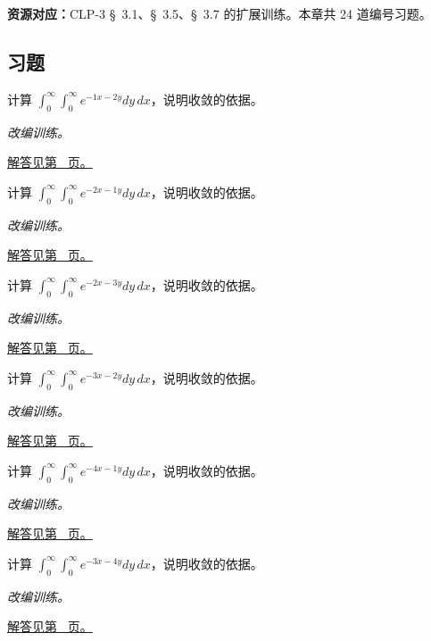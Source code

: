 \documentclass[UTF8,12pt,a4paper,fontset=fandol]{ctexart}
\begin{document}
\textbf{资源对应：}CLP-3 \S~3.1、\S~3.5、\S~3.7 的扩展训练。本章共 24 道编号习题。
\subsection{习题}
\begin{example}[第一象限的指数积分]\label{ex:c40q1}
计算 $\displaystyle\int_0^\infty\int_0^\infty e^{-1x-2y}dy\,dx$，说明收敛的依据。
\par\textit{改编训练。}\par\hyperref[ans:c40q1]{解答见第~\pageref{ans:c40q1} 页。}
\end{example}
\begin{example}[第一象限的指数积分]\label{ex:c40q2}
计算 $\displaystyle\int_0^\infty\int_0^\infty e^{-2x-1y}dy\,dx$，说明收敛的依据。
\par\textit{改编训练。}\par\hyperref[ans:c40q2]{解答见第~\pageref{ans:c40q2} 页。}
\end{example}
\begin{example}[第一象限的指数积分]\label{ex:c40q3}
计算 $\displaystyle\int_0^\infty\int_0^\infty e^{-2x-3y}dy\,dx$，说明收敛的依据。
\par\textit{改编训练。}\par\hyperref[ans:c40q3]{解答见第~\pageref{ans:c40q3} 页。}
\end{example}
\begin{example}[第一象限的指数积分]\label{ex:c40q4}
计算 $\displaystyle\int_0^\infty\int_0^\infty e^{-3x-2y}dy\,dx$，说明收敛的依据。
\par\textit{改编训练。}\par\hyperref[ans:c40q4]{解答见第~\pageref{ans:c40q4} 页。}
\end{example}
\begin{example}[第一象限的指数积分]\label{ex:c40q5}
计算 $\displaystyle\int_0^\infty\int_0^\infty e^{-4x-1y}dy\,dx$，说明收敛的依据。
\par\textit{改编训练。}\par\hyperref[ans:c40q5]{解答见第~\pageref{ans:c40q5} 页。}
\end{example}
\begin{example}[第一象限的指数积分]\label{ex:c40q6}
计算 $\displaystyle\int_0^\infty\int_0^\infty e^{-3x-4y}dy\,dx$，说明收敛的依据。
\par\textit{改编训练。}\par\hyperref[ans:c40q6]{解答见第~\pageref{ans:c40q6} 页。}
\end{example}
\end{document}
